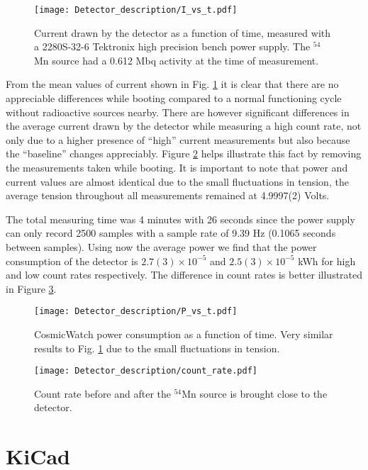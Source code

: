 \begin{figure}[H]
  \centering
  \texttt{[image: Detector\_description/I\_vs\_t.pdf]}
  \caption{Current drawn by the detector as a function of time, measured with a 2280S-32-6 Tektronix high precision bench power supply. The $^{54}$Mn source had a 0.612 Mbq activity at the time of measurement.}
  \label{fig:I_vs_t}
\end{figure}

From the mean values of current shown in Fig. \ref{fig:I_vs_t} it is clear that there are no appreciable differences while booting compared to a normal functioning cycle without radioactive sources nearby. There are however significant differences in the average current drawn by the detector while measuring a high count rate, not only due to a higher presence of ``high'' current measurements but also because the ``baseline'' changes appreciably. Figure \ref{fig:P_vs_t} helps illustrate this fact by removing the measurements taken while booting. It is important to note that power and current values are almost identical due to the small fluctuations in tension, the average tension throughout all measurements remained at 4.9997(2) Volts.

The total measuring time was 4 minutes with 26 seconds since the power supply can only record 2500 samples with a sample rate of 9.39 Hz (0.1065 seconds between samples). Using now the average power we find that the power consumption of the detector is $2.7(3)\times10^{-5}$ and $2.5(3)\times10^{-5}$ kWh for high and low count rates respectively. The difference in count rates is better illustrated in Figure \ref{fig:count_rate_for_power}.

\begin{figure}[H]
  \centering
  \texttt{[image: Detector\_description/P\_vs\_t.pdf]}
  \caption{CosmicWatch power consumption as a function of time. Very similar results to Fig. \ref{fig:I_vs_t} due to the small fluctuations in tension.}
  \label{fig:P_vs_t}
\end{figure}

\begin{figure}[H]
  \centering
  \texttt{[image: Detector\_description/count\_rate.pdf]}
  \caption{Count rate before and after the $^{54}$Mn source is brought close to the detector.}
  \label{fig:count_rate_for_power}
\end{figure}

\section{KiCad}

